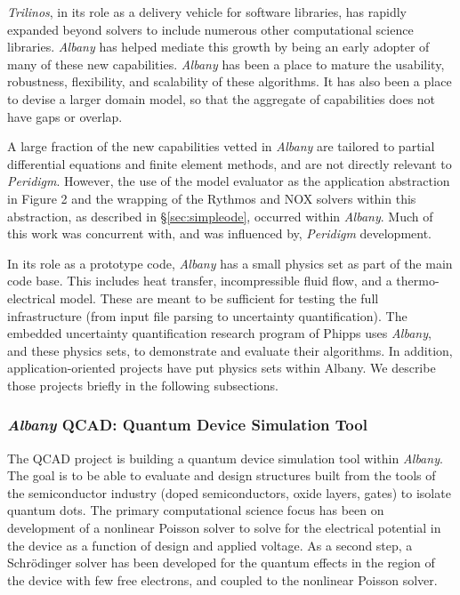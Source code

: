 \documentclass[pdf,ps2pdf,12pt,report]{SANDreport}
\theoremstyle{plain}
\theoremstyle{definition}
\theoremstyle{remark}
\numberwithin{equation}{section}
\begin{document}
\emph{Trilinos}, in its role as a delivery vehicle for software libraries, has rapidly expanded beyond solvers to include numerous other computational science libraries. \emph{Albany} has helped mediate this growth by being an early adopter of many of these new capabilities. \emph{Albany} has been a place to mature the usability, robustness, flexibility, and scalability of these algorithms. It has also been a place to devise a larger domain model, so that the aggregate of capabilities does not have gaps or overlap.

A large fraction of the new capabilities vetted in \emph{Albany} are tailored to partial differential equations and finite element methods, and are not directly relevant to \emph{Peridigm}. However, the use of the model evaluator as the application abstraction in Figure 2 and the wrapping of the Rythmos and NOX solvers within this abstraction, as described in \S\ref{sec:simpleode}, occurred within \emph{Albany}. Much of this work was concurrent with, and was influenced by, \emph{Peridigm} development.

In its role as a prototype code, \emph{Albany} has a small physics set as part of the main code base. This includes heat transfer, incompressible fluid flow, and a thermo-electrical model. These are meant to be sufficient for testing the full infrastructure (from input file parsing to uncertainty quantification). The embedded uncertainty quantification research program of Phipps uses \emph{Albany}, and these physics sets, to demonstrate and evaluate their algorithms. In addition, application-oriented projects have put physics sets within Albany. We describe those projects briefly in the following subsections.

\subsubsection{\emph{Albany} QCAD: Quantum Device Simulation Tool} \label{sec:albany:qcad}

The QCAD project \cite{QCADWebPage:2011} is building a quantum device simulation tool within \emph{Albany}. The goal is to be able to evaluate and design structures built from the tools of the semiconductor industry (doped semiconductors, oxide layers, gates) to isolate quantum dots. The primary computational science focus has been on development of a nonlinear Poisson solver to solve for the electrical potential in the device as a function of design and applied voltage. As a second step, a Schr\"{o}dinger solver has been developed for the quantum effects in the region of the device with few free electrons, and coupled to the nonlinear Poisson solver.
\end{document}
